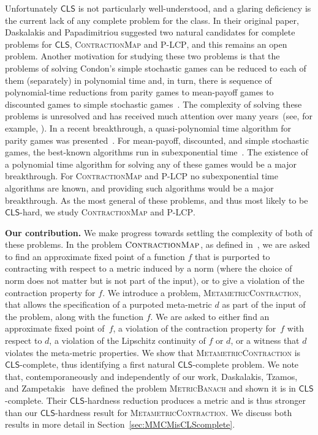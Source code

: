 \documentclass[a4paper,UKenglish]{lipics2}
\theoremstyle{definition}
\def\cc#1{\mathsf{#1}}
\def\CLS{\ensuremath{\cc{CLS}}\xspace}
\def\problem#1{\textsc{#1}}
\def\MMCM{\problem{MetametricContraction}\xspace}
\def\PLCP{\problem{P-LCP}\xspace}
\def\ContractionMap{\problem{ContractionMap}\xspace}
\def\MBanach{\problem{MetricBanach}\xspace}
\begin{document}
Unfortunately \CLS is not particularly well-understood, and a glaring
deficiency is the current lack of any complete problem for the class. In their
original paper, Daskalakis and Papadimitriou suggested two natural candidates
for complete problems for \CLS, \ContractionMap and \PLCP, and this remains an
open problem.
Another motivation for studying these two problems is that the problems of
solving Condon's simple stochastic games can be reduced to each of them
(separately) in polynomial time
and, in turn, there is sequence of polynomial-time reductions from parity games 
to mean-payoff games to discounted games to simple stochastic 
games~\cite{puri1996theory,gartner2005simple,jurdzinski2008simple,zwick1996complexity,hansen2013complexity}.
The complexity of solving these problems is unresolved and has received 
much attention over many years~(see, for example, 
\cite{zwick1996complexity,condon1992complexity,fearnley2010linear,jurdzinski1998deciding,bjorklund2004combinatorial,fearnley2016complexity}).
In a recent breakthrough, a quasi-polynomial time algorithm for parity games
was presented~\cite{parity}.
For mean-payoff, discounted, and simple stochastic games, the best-known 
algorithms run in subexponential time~\cite{ludwig1995subexponential}.
The existence of a polynomial time algorithm for solving any of these games
would be a major breakthrough.
For \ContractionMap and \PLCP no subexponential time algorithms 
are known, and providing such algorithms would be a major breakthrough.
As the most general of these problems, and thus most likely to be 
\CLS-hard, we study \ContractionMap and \PLCP.

\noindent
\textbf{Our contribution.}
We make progress towards settling the complexity of both of these problems. In
the problem $\ContractionMap$, as defined in~\cite{daskalakis2011continuous}, we
are asked to find an approximate fixed point of a function $f$ that is purported
to contracting with respect to a metric induced by a norm (where the choice of
norm does not matter but is not part of the input), or to give a violation of
the contraction property for $f$. We introduce a problem, \MMCM, that allows
the specification of a purpoted meta-metric $d$ as part of the input of the problem,
along with the function $f$. We are asked to either find an approximate fixed
point of~$f$, a violation of the contraction property for~$f$ with respect to
$d$, a violation of the Lipschitz continuity of $f$ or $d$, or a witness that $d$ violates 
the meta-metric properties.
We show that \MMCM is \CLS-complete, thus identifying a first natural \CLS-complete problem.
We note that, contemporaneously and independently of our work, Daskalakis, Tzamos, and
Zampetakis~\cite{DTZ17} have defined the problem \MBanach and shown it is in \CLS-complete.
Their \CLS-hardness reduction produces a metric and 
is thus stronger than our \CLS-hardness result for \MMCM. 
We discuss both results in more detail in Section~\ref{sec:MMCMisCLScomplete}.
\end{document}
